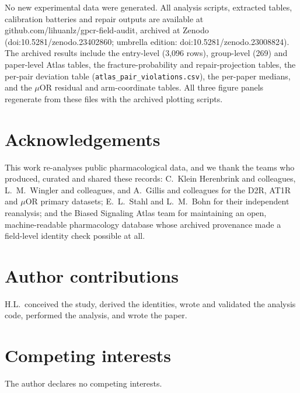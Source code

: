 ﻿\documentclass[11pt,a4paper]{article}
\begin{document}
No new experimental data were generated. All analysis scripts, extracted tables, calibration batteries and repair outputs are available at github.com/lihuanlz/gpcr-field-audit, archived at Zenodo (doi:10.5281/zenodo.23402860; umbrella edition: doi:10.5281/zenodo.23008824). The archived results include the entry-level (3{,}096 rows), group-level (269) and paper-level Atlas tables, the fracture-probability and repair-projection tables, the per-pair deviation table (\texttt{atlas\_pair\_violations.csv}), the per-paper medians, and the $\mu$OR residual and arm-coordinate tables. All three figure panels regenerate from these files with the archived plotting scripts.

\section*{Acknowledgements}

This work re-analyses public pharmacological data, and we thank the teams who produced, curated and shared these records: C.~Klein Herenbrink and colleagues, L.~M.~Wingler and colleagues, and A.~Gillis and colleagues for the D2R, AT1R and $\mu$OR primary datasets; E.~L.~Stahl and L.~M.~Bohn for their independent reanalysis; and the Biased Signaling Atlas team for maintaining an open, machine-readable pharmacology database whose archived provenance made a field-level identity check possible at all.

\section*{Author contributions}

H.L.\ conceived the study, derived the identities, wrote and validated the analysis code, performed the analysis, and wrote the paper.

\section*{Competing interests}

The author declares no competing interests.
\end{document}
